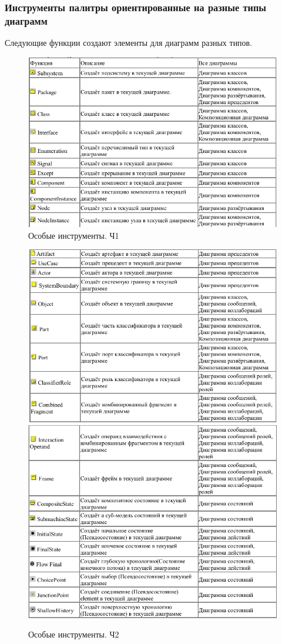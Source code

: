 \documentclass[a4paper,12pt]{extreport}
\begin{document}
\subsubsection*{Инструменты палитры ориентированные на разные типы диаграмм}
Следующие функции создают элементы для диаграмм разных типов.
\begin{figure}[h!]
	\centering
	\includegraphics[width=0.9\linewidth]{images/diffinstruments1}
	\caption{Особые инструменты. Ч1}
	\label{fig:diffinstruments1}
\end{figure}
\newpage
\begin{figure}[h!]
	\centering
	\includegraphics[width=0.9\linewidth]{images/diffinstruments2}
	\includegraphics[width=0.9\linewidth]{images/diffinstruments3}
	\caption{Особые инструменты. Ч2}
	\label{fig:diffinstruments2}
\end{figure}
\end{document}
